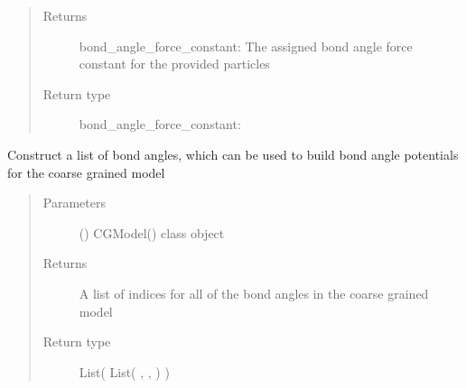 \documentclass[letterpaper,12pt,english,openany,oneside]{sphinxmanual}
\begin{document}
\begin{fulllineitems}
\begin{fulllineitems}
\begin{quote}
\begin{description}
\begin{itemize}
\end{itemize}

\item[{Returns}] \leavevmode
bond\_angle\_force\_constant: The assigned bond angle force constant for the provided particles

\item[{Return type}] \leavevmode

bond\_angle\_force\_constant: 


\end{description}\end{quote}

\end{fulllineitems}


\begin{fulllineitems}
\label{\detokenize{cg_model:cg_model.cgmodel.CGModel.get_bond_angle_list}}
Construct a list of bond angles, which can be used to build bond angle potentials for the coarse grained model
\begin{quote}\begin{description}
\item[{Parameters}] \leavevmode
{} () \textendash{} CGModel() class object

\item[{Returns}] \leavevmode
A list of indices for all of the bond angles in the coarse grained model

\item[{Return type}] \leavevmode
List( List( , ,  ) )

\end{description}\end{quote}

\end{fulllineitems}



\end{fulllineitems}
\end{document}
